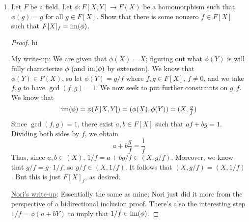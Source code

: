 \documentclass[../notes.tex]{subfiles}
\begin{document}
\begin{enumerate}
\begin{proof}
        \underline{Nori's write-up}: Since $\R[X]$ is a PID, Bezout's identity tells us that it will suffice to show that $\gcd_{\R[X]}(f,f')=1$. As in my write up, we factor $f(X)$ into "irreducibles\footnote{Clearly, Nori has no problem with us identifying monomials as irreducibles without proof.}" and seek to prove that $X-a_i$ does not divide $f'$ for any $i$. That is, we need to prove that $f'(a_i)\neq 0$ for any $i$.\par
        Since $f(a_i)=0$ for all $i$, we can write $f(X)=(X-a_i)g(X)$ for any $i$. Since $f$ has no repeated roots, we can assume that $g(a_i)\neq 0$. Taking the derivative of the previous expression, we see that
        \begin{equation*}
            f'(X) = g(X)+(X-a_i)g'(X)
        \end{equation*}
        In particular,
        \begin{equation*}
            f'(a_i) = g(a_i)+(a_i-a_i)g'(a_i)
            = g(a_i)
            \neq 0
        \end{equation*}
        Thus, $f'$ does not have any $a_i\in\R$ as a root, so we're done.
    \end{proof}
    \item Let $F$ be a field. Let $\phi:F[X,Y]\to F(X)$ be a homomorphism such that $\phi(g)=g$ for all $g\in F[X]$. Show that there is some nonzero $f\in F[X]$ such that $F[X]_f=\operatorname{im}(\phi)$.
    \begin{proof}
        {\color{white}hi}\par
        \underline{My write-up}: We are given that $\phi(X)=X$; figuring out what $\phi(Y)$ is will fully characterize $\phi$ (and $\operatorname{im}(\phi)$ by extension). We know that $\phi(Y)\in F(X)$, so let $\phi(Y)=g/f$ where $f,g\in F[X]$, $f\neq 0$, and we take $f,g$ to have $\gcd(f,g)=1$. We now seek to put further constraints on $g,f$. We know that
        \begin{equation*}
            \operatorname{im}(\phi) = \phi(F[X,Y])
            = (\phi(X),\phi(Y))
            = (X,\tfrac{g}{f})
        \end{equation*}
        Since $\gcd(f,g)=1$, there exist $a,b\in F[X]$ such that $af+bg=1$. Dividing both sides by $f$, we obtain
        \begin{equation*}
            a+b\frac{g}{f} = \frac{1}{f}
        \end{equation*}
        Thus, since $a,b\in(X)$, $1/f=a+bg/f\in(X,g/f)$. Moreover, we know that $g/f=g\cdot 1/f$, so $g/f\in(X,1/f)$. It follows that $(X,g/f)=(X,1/f)$. But this is just $F[X]_f$, as desired.\par
        \underline{Nori's write-up}: Essentially the same as mine; Nori just did it more from the perspective of a bidirectional inclusion proof. There's also the interesting step $1/f=\phi(a+bY)$ to imply that $1/f\in\operatorname{im}(\phi)$.
    \end{proof}
\end{enumerate}
\end{document}
